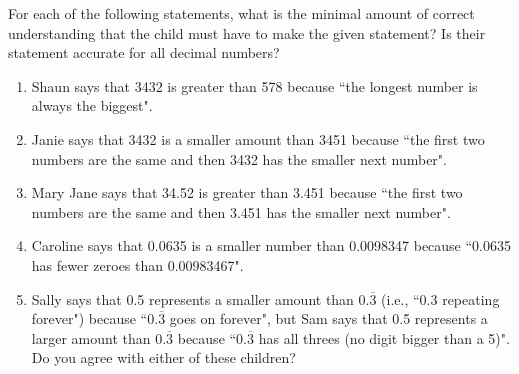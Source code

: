 \documentclass{ximera}
\begin{document}
\begin{question}
For each of the following statements, what is the minimal amount of correct understanding that the child must have to make the given statement?  Is their statement accurate for all decimal numbers?
\begin{enumerate}
    

\item Shaun says that 3432 is greater than 578 because ``the longest number is always the biggest".

\vfill



\item Janie says that 3432 is a smaller amount than 3451 because ``the first two numbers are the same and then 3432 has the smaller next number".
\vfill

\item Mary Jane says that 34.52  is greater than 3.451 because ``the first two numbers are the same and then 3.451 has the smaller next number".
\vfill

\item Caroline says that 0.0635  is a smaller number than  0.0098347 because ``0.0635 has fewer zeroes than 0.00983467".
\vfill

\item Sally says that 0.5  represents a smaller amount than 0.$\overline{3}$  (i.e., ``0.3 repeating forever") because ``0.$\overline{3}$ goes on forever", but Sam says that 0.5 represents a larger amount than 0.$\overline{3}$ because ``0.$\overline{3}$ has all threes (no digit bigger than a 5)".  Do you agree with either of these children?
\vfill

\end{enumerate}

\end{question}
\end{document}
